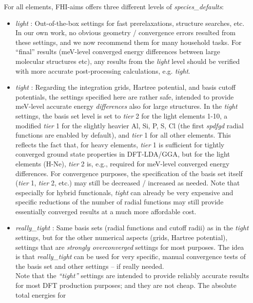 For all elements, FHI-aims offers three different levels of
\emph{species\_defaults}: 
\begin{itemize}
  \item \emph{light} :
    Out-of-the-box settings for fast prerelaxations, structure searches,
    etc. In our own work, no obvious geometry / convergence errors resulted
    from these settings, and we now recommend them for many household
    tasks. For ``final'' results (meV-level converged energy differences between
    large molecular structures etc), any results from the \emph{light} level
    should be verified with more accurate post-processing calculations,
    e.g. \emph{tight}. 
  \item \emph{tight} : 
    Regarding the integration grids, Hartree
    potential, and basis cutoff potentials, the settings specified here are
    rather safe, intended to provide meV-level accurate energy
    \emph{differences} also for large structures. In the \emph{tight} settings,
    the basis set level is set to \emph{tier} 2 for the light elements 1-10, a
    modified \emph{tier} 1 for the slightly heavier Al, Si, P, S, Cl (the first
    \emph{spdfgd} radial functions are enabled by default),
    and \emph{tier} 1 for all other elements. This reflects the fact that, for
    heavy elements, \emph{tier} 1 is sufficient for tightly converged ground
    state properties in DFT-LDA/GGA, but for the light elements (H-Ne),
    \emph{tier} 2 is, e.g., required for meV-level converged energy
    differences. For convergence
    purposes, the specification of the basis set itself (\emph{tier}
    1, \emph{tier} 2, etc.) may still be 
    decreased / increased as needed. Note that especially for hybrid functionals,
    \emph{tight} can already be very expensive and specific reductions
    of the number of radial functions may still provide essentially
    converged results at a much more affordable cost.
  \item \emph{really\_tight} : 
    Same basis sets (radial functions and cutoff radii) as in the
    \emph{tight} settings, but for the other numerical aspects (grids,
    Hartree potential), settings that are \emph{strongly
    overconverged} settings for most purposes. The idea is that
    \emph{really\_tight} can be used for very specific, manual
    convergence tests of the basis set and other settings -- if really
    needed. \\ 
    Note that the \emph{``tight''} settings are intended to
    provide reliably accurate results for most DFT production
    purposes; and they are not cheap. The absolute total energies for

\end{itemize}
